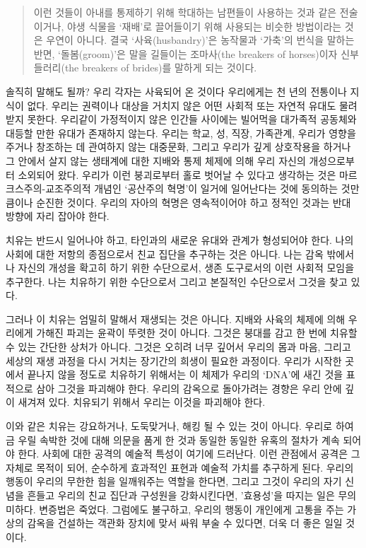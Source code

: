\documentclass[10pt, b6paper, openany]{memoir}
\begin{document}
\begin{article}
\begin{quote}
이런 것들이 아내를 통제하기 위해 학대하는 남편들이 사용하는 것과 같은 전술이거나, 야생 식물을 `재배'로 끌어들이기 위해 사용되는 비슷한 방법이라는 것은 우연이 아니다. 결국 `사육(husbandry)'은 농작물과 `가축'의 번식을 말하는 반면, `돌봄(groom)'은 말을 길들이는 조마사(the breakers of horses)이자 신부 들러리(the breakers of brides)를 말하게 되는 것이다.
\end{quote}

솔직히 말해도 될까? 우리 각자는 사육되어 온 것이다 우리에게는 천 년의 전통이나 지식이 없다. 우리는 권력이나 대상을 거치지 않은 어떤 사회적 또는 자연적 유대도 물려받지 못한다. 우리같이 가정적이지 않은 인간들 사이에는 빌어먹을 대가족적 공동체와 대등할 만한 유대가 존재하지 않는다. 우리는 학교, 성, 직장, 가족관계, 우리가 영향을 주거나 창조하는 데 관여하지 않는 대중문화, 그리고 우리가 깊게 상호작용을 하거나 그 안에서 살지 않는 생태계에 대한 지배와 통제 체제에 의해 우리 자신의 개성으로부터 소외되어 왔다. 우리가 이런 붕괴로부터 홀로 벗어날 수 있다고 생각하는 것은 마르크스주의-교조주의적 개념인 `공산주의 혁명'이 일거에 일어난다는 것에 동의하는 것만큼이나 순진한 것이다. 우리의 자아의 혁명은 영속적이어야 하고 정적인 것과는 반대 방향에 자리 잡아야 한다. 

치유는 반드시 일어나야 하고, 타인과의 새로운 유대와 관계가 형성되어야 한다. 나의 사회에 대한 저항의 종점으로서 친교 집단을 추구하는 것은 아니다. 나는 감옥 밖에서 나 자신의 개성을 확고히 하기 위한 수단으로서, 생존 도구로서의 이런 사회적 모임을 추구한다. 나는 치유하기 위한 수단으로서 그리고 본질적인 수단으로서 그것을 찾고 있다.

그러나 이 치유는 엄밀히 말해서 재생되는 것은 아니다. 지배와 사육의 체제에 의해 우리에게 가해진 파괴는 윤곽이 뚜렷한 것이 아니다. 그것은 붕대를 감고 한 번에 치유할 수 있는 간단한 상처가 아니다. 그것은 오히려 너무 깊어서 우리의 몸과 마음, 그리고 세상의 재생 과정을 다시 거치는 장기간의 희생이 필요한 과정이다. 우리가 시작한 곳에서 끝나지 않을 정도로 치유하기 위해서는 이 체제가 우리의 ‘DNA’에 새긴 것을 표적으로 삼아 그것을 파괴해야 한다. 우리의 감옥으로 돌아가려는 경향은 우리 안에 깊이 새겨져 있다. 치유되기 위해서 우리는 이것을 파괴해야 한다. 

이와 같은 치유는 강요하거나, 도둑맞거나, 해킹 될 수 있는 것이 아니다. 우리로 하여금 우릴 속박한 것에 대해 의문을 품게 한 것과 동일한 동일한 유혹의 절차가 계속 되어야 한다. 사회에 대한 공격의 예술적 특성이 여기에 드러난다. 이런 관점에서 공격은 그 자체로 목적이 되어, 순수하게 효과적인 표현과 예술적 가치를 추구하게 된다. 우리의 행동이 우리의 무한한 힘을 일깨워주는 역할을 한다면, 그리고 그것이 우리의 자기 신념을 흔들고 우리의 친교 집단과 구성원을 강화시킨다면, '효용성'을 따지는 일은 무의미하다. 변증법은 죽었다. 그럼에도 불구하고, 우리의 행동이 개인에게 고통을 주는 가상의 감옥을 건설하는 객관화 장치에 맞서 싸워 부술 수 있다면, 더욱 더 좋은 일일 것이다. 


\end{article}
\end{document}
